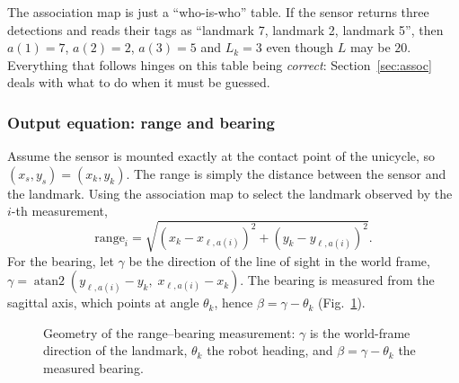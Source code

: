 \documentclass[11pt,a4paper]{article}
\theoremstyle{definition}
\theoremstyle{plain}
\theoremstyle{remark}
\DeclareMathOperator{\atantwo}{atan2}
\newcommand{\robot}[3][fill=white]{\begin{scope}[shift={(#2)},rotate=#3]\draw[#1,thick] (0.24,0)--(-0.16,0.15)--(-0.16,-0.15)--cycle;\end{scope}}
\begin{document}
\begin{intuition}
The association map is just a ``who-is-who'' table. If the sensor returns three detections and reads their tags as ``landmark 7, landmark 2, landmark 5'', then $a(1)=7$, $a(2)=2$, $a(3)=5$ and $L_k=3$ even though $L$ may be $20$. Everything that follows hinges on this table being \emph{correct}: Section~\ref{sec:assoc} deals with what to do when it must be guessed.
\end{intuition}

\subsubsection*{Output equation: range and bearing}
Assume the sensor is mounted exactly at the contact point of the unicycle, so $(x_s,y_s)=(x_k,y_k)$. The range is simply the distance between the sensor and the landmark. Using the association map to select the landmark observed by the $i$-th measurement,
\[
\text{range}_i=\sqrt{(x_k-x_{\ell,a(i)})^2+(y_k-y_{\ell,a(i)})^2}.
\]
For the bearing, let $\gamma$ be the direction of the line of sight in the world frame, $\gamma=\atantwo(y_{\ell,a(i)}-y_k,\;x_{\ell,a(i)}-x_k)$. The bearing is measured from the sagittal axis, which points at angle $\theta_k$, hence $\beta=\gamma-\theta_k$ (Fig.~\ref{fig:bearing}).

\begin{figure}[H]
\centering
{}
\caption{Geometry of the range--bearing measurement: $\gamma$ is the world-frame direction of the landmark, $\theta_k$ the robot heading, and $\beta=\gamma-\theta_k$ the measured bearing.}
\label{fig:bearing}
\end{figure}
\end{document}
